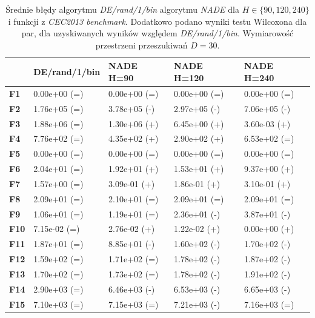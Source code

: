\documentclass[12pt,a4paper]{report}
\begin{document}
{{{{{{\begin{table}[]
\centering
\caption{Średnie błędy algorytmu \emph{DE/rand/1/bin} algorytmu \emph{NADE} dla $H \in \{90, 120, 240\}$ i funkcji z \emph{CEC2013 benchmark}. Dodatkowo podano wyniki testu Wilcoxona dla par, dla uzyskiwanych wyników względem \emph{DE/rand/1/bin}. Wymiarowość przestrzeni przeszukiwań $D = 30$.}
\label{Eksp2}
\begin{tabular}{|l|l|l|l|l|}
\hline
{\bf }    & {\bf DE/rand/1/bin} & {\bf NADE H=90} & {\bf NADE H=120} & {\bf NADE H=240} \\ \hline
{\bf F1}  & 0.00e+00 (=)        & 0.00e+00 (=)    & 0.00e+00 (=)     & 0.00e+00 (=)     \\ \hline
{\bf F2}  & 1.76e+05 (=)        & 3.78e+05 (-)    & 2.97e+05 (-)     & 7.06e+05 (-)     \\ \hline
{\bf F3}  & 1.88e+06 (=)        & 1.30e+06 (+)    & 6.45e+00 (+)     & 3.60e-03 (+)     \\ \hline
{\bf F4}  & 7.76e+02 (=)        & 4.35e+02 (+)    & 2.90e+02 (+)     & 6.53e+02 (=)     \\ \hline
{\bf F5}  & 0.00e+00 (=)        & 0.00e+00 (=)    & 0.00e+00 (=)     & 0.00e+00 (=)     \\ \hline
{\bf F6}  & 2.04e+01 (=)        & 1.92e+01 (+)    & 1.53e+01 (+)     & 9.37e+00 (+)     \\ \hline
{\bf F7}  & 1.57e+00 (=)        & 3.09e-01 (+)    & 1.86e-01 (+)     & 3.10e-01 (+)     \\ \hline
{\bf F8}  & 2.09e+01 (=)        & 2.10e+01 (=)    & 2.09e+01 (=)     & 2.09e+01 (=)     \\ \hline
{\bf F9}  & 1.06e+01 (=)        & 1.19e+01 (=)    & 2.36e+01 (-)     & 3.87e+01 (-)     \\ \hline
{\bf F10} & 7.15e-02 (=)        & 2.76e-02 (+)    & 1.22e-02 (+)     & 0.00e+00 (+)     \\ \hline
{\bf F11} & 1.87e+01 (=)        & 8.85e+01 (-)    & 1.60e+02 (-)     & 1.70e+02 (-)     \\ \hline
{\bf F12} & 1.59e+02 (=)        & 1.71e+02 (=)    & 1.78e+02 (-)     & 1.87e+02 (-)     \\ \hline
{\bf F13} & 1.70e+02 (=)        & 1.73e+02 (=)    & 1.78e+02 (-)     & 1.91e+02 (-)     \\ \hline
{\bf F14} & 2.90e+03 (=)        & 6.46e+03 (-)    & 6.53e+03 (-)     & 6.65e+03 (-)     \\ \hline
{\bf F15} & 7.10e+03 (=)        & 7.15e+03 (=)    & 7.21e+03 (-)     & 7.16e+03 (=)     \\ \hline

\end{tabular}
\end{table}}}}}}}
\end{document}
